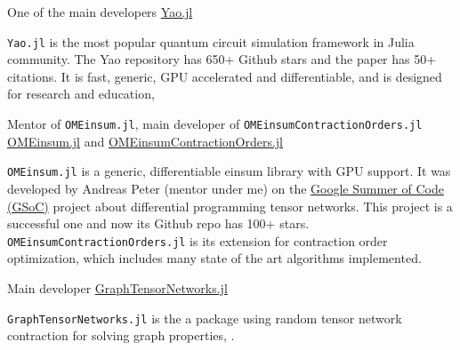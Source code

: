 \documentclass[11pt, a4paper]{awesome-cv}
\begin{document}
\begin{cventries}
  \cventry
    {One of the main developers} %
    {\href{https://github.com/QuantumBFS/Yao.jl}{Yao.jl}} %
    {} %
    {} %
    {
      \begin{cvitems} %
          {\texttt{Yao.jl} is the most popular quantum circuit simulation framework in Julia community.
          The Yao repository has 650+ Github stars and the paper has 50+ citations.
          It is fast, generic, GPU accelerated and differentiable, and is designed for research and education, 
          }
      \end{cvitems}
    }
  \cventry
    {Mentor of \texttt{OMEinsum.jl}, main developer of \texttt{OMEinsumContractionOrders.jl}} %
    {\href{https://github.com/under-Peter/OMEinsum.jl}{OMEinsum.jl} and \href{OMEinsumContractionOrders.jl}{OMEinsumContractionOrders.jl}} %
    {}{}
    {
      \begin{cvitems} %
          {\texttt{OMEinsum.jl} is a generic, differentiable einsum library with GPU support. It was developed by Andreas Peter (mentor under me) on the \href{https://summerofcode.withgoogle.com/}{Google Summer of Code (GSoC)} project about differential programming tensor networks. This project is a successful one and now its Github repo has 100+ stars.
          \texttt{OMEinsumContractionOrders.jl} is its extension for contraction order optimization, which includes many state of the art algorithms implemented.}
      \end{cvitems}
    }

  \cventry
    {Main developer}
    {\href{https://github.com/Happy-Diode/GraphTensorNetworks.jl}{GraphTensorNetworks.jl}} %
    {}{}
    {
      \begin{cvitems} %
          {\texttt{GraphTensorNetworks.jl} is the a package using random tensor network contraction for solving graph properties,
          .}
      \end{cvitems}
    }

\end{cventries}
\end{document}
